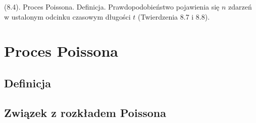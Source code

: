 {
\makeatletter
{}
\makeatother
\graphicspath{{../probabil}}

\begin{questiontext}
	(8.4). Proces Poissona. Definicja. Prawdopodobieństwo pojawienia się \(n\) zdarzeń w ustalonym odcinku czasowym długości \(t\) (Twierdzenia 8.7 i 8.8).
\end{questiontext}

\section{Proces Poissona}
\subsection{Definicja}


\subsection{Związek z rozkładem Poissona}


}